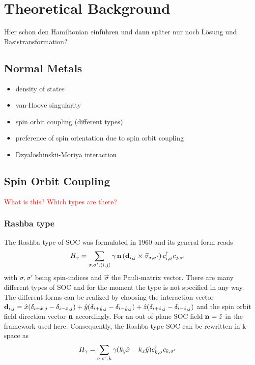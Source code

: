 \section{Theoretical Background}
Hier schon den Hamiltonian einführen und dann später nur noch Lösung und Basistransformation?

\subsection{Normal Metals}
\begin{itemize}
    \item density of states
    \item van-Hoove singularity
    \item spin orbit coupling (different types)
    \item preference of spin orientation due to spin orbit coupling 
    \item Dzyaloshinskii-Moriya interaction 
\end{itemize}

\subsection{Spin Orbit Coupling}


\textcolor{red}{What is this? \newline Which types are there?} \newline

\subsubsection{Rashba type}
The Rashba type of SOC was formulated in 1960 \cite{rashba1960properties} and its general form reads
\begin{equation} \label{eq:general_rashba}
    H_{\gamma} = \sum_{\sigma, \sigma', \langle i,j\rangle} \vb{\gamma}\, \vb{n} \left(\vb{d}_{i,j} \times \Vec{\sigma}_{\sigma, \sigma'} \right) c^{\dag}_{i,\sigma}c_{j,\sigma'}
\end{equation}
with $\sigma, \sigma'$ being spin-indices and $\Vec{\sigma}$ the Pauli-matrix vector. 
There are many different types of SOC and for the moment the type is not specified in any way.
The different forms can be realized by choosing the interaction vector $\vb{d}_{i,j} = \hat{x}(\delta_{i+\hat{x},j}-\delta_{i-\hat{x},j})+\hat{y}(\delta_{i+\hat{y},j}-\delta_{i-\hat{y},j}) +\hat{z}(\delta_{i+\hat{z},j}-\delta_{i-\hat{z},j})$ and the spin orbit field direction vector $\vb{n}$ accordingly.\newline
For an out of plane SOC field $\vb{n} = \hat{z}$ in the framework used here.
Consequently, the Rashba type SOC can be rewritten in k-space as
\begin{align}\label{eq:rashba_SOC}
H_{\gamma} = \sum_{\sigma, \sigma',k} \vb{\gamma}(k_y \hat{x}-k_x\hat{y}) c^{\dag}_{k,\sigma}c_{k,\sigma'}
\end{align}

